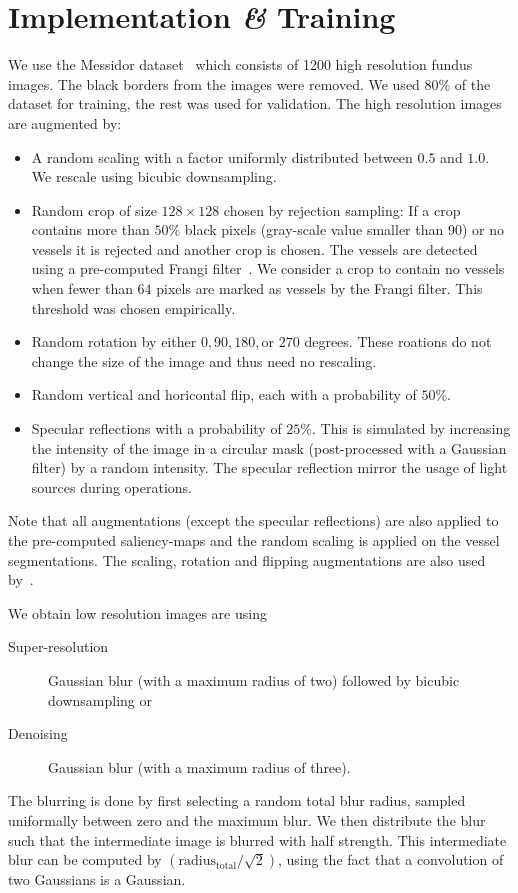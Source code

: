 \documentclass{scrartcl}
\begin{document}
\section{Implementation \textit{\&} Training}
We use the Messidor dataset~\cite{Messidor} which consists of 1200 high resolution fundus images.
The black borders from the images were removed.
We used 80\% of the dataset for training, the rest was used for validation.
The high resolution images are augmented by:
\begin{itemize}
\item A random scaling with a factor uniformly distributed between $0.5$ and $1.0$.
  We rescale using bicubic downsampling.
\item Random crop of size $128 \times 128$ chosen by rejection sampling:
If a crop contains more than $50\%$ black pixels (gray-scale value smaller than 90) or no vessels it is rejected and another crop is chosen.
The vessels are detected using a pre-computed Frangi filter~\cite{Frangi}.
We consider a crop to contain no vessels when fewer than $64$ pixels are marked as vessels by the Frangi filter.
This threshold was chosen empirically.
\item Random rotation by either $0, 90, 180, \text{or } 270$ degrees.
  These roations do not change the size of the image and thus need no rescaling.
\item Random vertical and horicontal flip, each with a probability of $50\%$.
\item Specular reflections with a probability of $25\%$.
This is simulated by increasing the intensity of the image in a circular mask (post-processed with a Gaussian filter) by a random intensity.
The specular reflection mirror the usage of light sources during operations.
\end{itemize}
Note that all augmentations (except the specular reflections) are also applied to the pre-computed saliency-maps and the random scaling is applied on the vessel segmentations.
The scaling, rotation and flipping augmentations are also used by~\cite{LapSRN}.

We obtain low resolution images are using
\begin{description}
\item[Super-resolution] Gaussian blur (with a maximum radius of two) followed by bicubic downsampling or
\item[Denoising] Gaussian blur (with a maximum radius of three).
\end{description}
The blurring is done by first selecting a random total blur radius, sampled uniformally between zero and the maximum blur.
We then distribute the blur such that the intermediate image is blurred with half strength.
This intermediate blur can be computed by \( \left( \text{radius}_{\text{total}} / \sqrt{2} \right)\), using the fact that a convolution of two Gaussians is a Gaussian.
\end{document}
